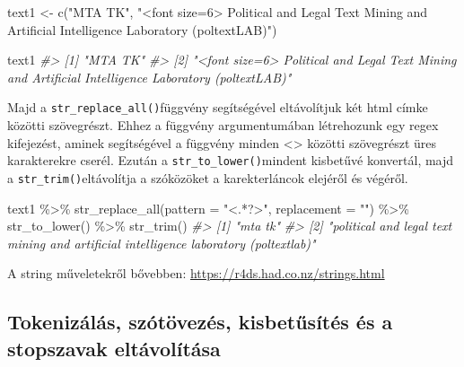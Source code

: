 \documentclass[
]{book}
\newenvironment{Shaded}{\begin{snugshade}}{\end{snugshade}}
\newcommand{\AttributeTok}[1]{\textcolor[rgb]{0.77,0.63,0.00}{#1}}
\newcommand{\CommentTok}[1]{\textcolor[rgb]{0.56,0.35,0.01}{\textit{#1}}}
\newcommand{\FunctionTok}[1]{\textcolor[rgb]{0.00,0.00,0.00}{#1}}
\newcommand{\NormalTok}[1]{#1}
\newcommand{\OtherTok}[1]{\textcolor[rgb]{0.56,0.35,0.01}{#1}}
\newcommand{\SpecialCharTok}[1]{\textcolor[rgb]{0.00,0.00,0.00}{#1}}
\newcommand{\StringTok}[1]{\textcolor[rgb]{0.31,0.60,0.02}{#1}}
\begin{document}
\begin{Shaded}
\begin{Highlighting}[]

\NormalTok{text1 }\OtherTok{\textless{}{-}} \FunctionTok{c}\NormalTok{(}\StringTok{"MTA TK"}\NormalTok{, }\StringTok{"\textless{}font size=\textquotesingle{}6\textquotesingle{}\textgreater{} Political and Legal Text Mining and Artificial Intelligence Laboratory (poltextLAB)"}\NormalTok{)}

\NormalTok{text1}
\CommentTok{\#\textgreater{} [1] "MTA TK"                                                                                             }
\CommentTok{\#\textgreater{} [2] "\textless{}font size=\textquotesingle{}6\textquotesingle{}\textgreater{} Political and Legal Text Mining and Artificial Intelligence Laboratory (poltextLAB)"}
\end{Highlighting}
\end{Shaded}

Majd a \texttt{str\_replace\_all()}függvény segítségével eltávolítjuk
két html címke közötti szövegrészt. Ehhez a függvény argumentumában
létrehozunk egy regex kifejezést, aminek segítségével a függvény minden
\textless\textgreater{} közötti szövegrészt üres karakterekre cserél.
Ezután a \texttt{str\_to\_lower()}mindent kisbetűvé konvertál, majd a
\texttt{str\_trim()}eltávolítja a szóközöket a karekterláncok elejéről
és végéről.

\begin{Shaded}
\begin{Highlighting}[]

\NormalTok{text1 }\SpecialCharTok{\%\textgreater{}\%}
  \FunctionTok{str\_replace\_all}\NormalTok{(}\AttributeTok{pattern =} \StringTok{"\textless{}.*?\textgreater{}"}\NormalTok{, }\AttributeTok{replacement =} \StringTok{""}\NormalTok{) }\SpecialCharTok{\%\textgreater{}\%}
  \FunctionTok{str\_to\_lower}\NormalTok{() }\SpecialCharTok{\%\textgreater{}\%}
  \FunctionTok{str\_trim}\NormalTok{()}
\CommentTok{\#\textgreater{} [1] "mta tk"                                                                             }
\CommentTok{\#\textgreater{} [2] "political and legal text mining and artificial intelligence laboratory (poltextlab)"}
\end{Highlighting}
\end{Shaded}

A string műveletekről bővebben:
\url{https://r4ds.had.co.nz/strings.html}

\hypertarget{tokenizuxe1luxe1s-szuxf3tuxf6vezuxe9s-kisbetux171suxedtuxe9s-uxe9s-a-stopszavak-eltuxe1voluxedtuxe1sa}{%
\subsection{Tokenizálás, szótövezés, kisbetűsítés és a stopszavak
eltávolítása}\label{tokenizuxe1luxe1s-szuxf3tuxf6vezuxe9s-kisbetux171suxedtuxe9s-uxe9s-a-stopszavak-eltuxe1voluxedtuxe1sa}}
\end{document}
